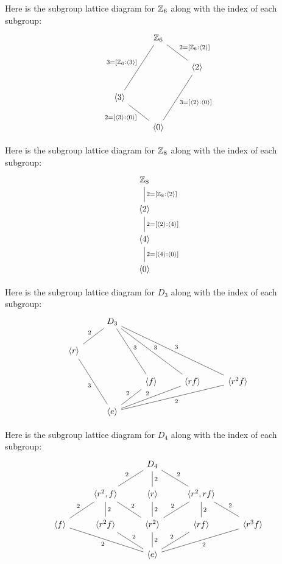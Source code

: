 \documentclass{ximera}
\begin{document}
\begin{example}
   Here is the subgroup lattice diagram for $\mathbb Z_6$ along with the
   index of each subgroup:   
  \[
  \begin{tikzcd}
    & \Z_6 \ar[rd,-,"{2=[\Z_6:\<2\>]}"]  \ar[ldd,-,"{3=[\Z_6:\<3\>]}",swap] &       \\
    &       & \<2\> \ar[ldd,-,"{3=[\<2\>:\<0\>]}"]\\
    \< 3\> \ar[rd,-,"{2=[\<3\>:\<0\>]}",swap]&       &       \\   
    & \<0\> &
  \end{tikzcd}
  \]
\end{example}



\begin{example}
   Here is the subgroup lattice diagram for $\mathbb Z_8$ along with the
   index of each subgroup:   
   \[
   \begin{tikzcd}
     \Z_8  \ar[d,-,"{2 = [\Z_8:\<2\>]}"] \\
     \<2\> \ar[d,-,"{2 = [\<2\>:\<4\>]}"] \\
     \<4\> \ar[d,-,"{2 = [\<4\>:\<0\>]}"] \\   
     \<0\> 
\end{tikzcd}
\]
\end{example}


\begin{example}
  Here is the subgroup lattice diagram for $D_3$ along with the
   index of each subgroup:   
  \[
  \begin{tikzcd}
    & D_3 \ar[rdd,-,"3"]\ar[rrdd,-,"3"]\ar[rrrdd,-,"3"]  \ar[ld,-,"2",swap] & & &      \\
    \<r\> \ar[rdd,-,"3",swap]       &       &  & &  \\
    &       &  \< f\> \ar[ld,-,"2",swap]   &  \< rf\> \ar[lld,-,"2",swap]       &  \< r^2f\> \ar[llld,-,"2"]        \\   
    & \<e\> & & &
  \end{tikzcd}
  \]
\end{example}


\begin{example}
  Here is the subgroup lattice diagram for $D_4$ along with the index
  of each subgroup:
  \[
\begin{tikzcd}
   &    & D_4 \ar[rd,-,"2"] \ar[d,-,"2"] \ar[ld,-,"2",swap] &       \\
&\<r^2,f\>  \ar[rd,-,"2"] \ar[d,-,"2"] \ar[ld,-,"2",swap]& \<r \>  \ar[d,-,"2"]     & \<r^2,rf\> \ar[ld,-,"2",swap] \ar[d,-,"2"] \ar[rd,-,"2"]\\
\<f\>\ar[rrd,-,"2",swap]& \<r^2f\> \ar[rd,-,"2"]&\< r^2\> \ar[d,-,"2"]  &   \<rf\> \ar[ld,-,"2",swap]& \<r^3f\>\ar[lld,-,"2"]     \\   
  &     & \<e\> &  &
\end{tikzcd}
\]
\end{example}
\end{document}
